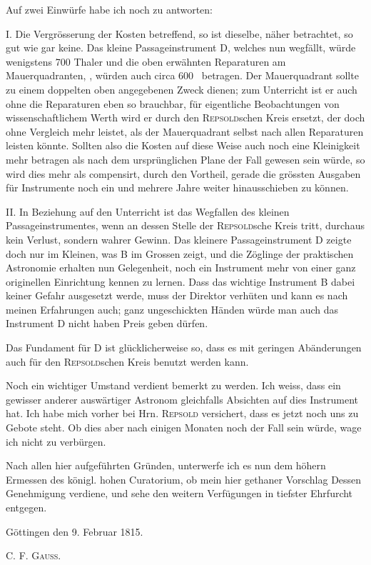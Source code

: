 Auf zwei Einwürfe habe ich noch zu antworten:\par
\noindent\hspace*{\parindent}I. Die Vergrösserung der Kosten betreffend, so ist dieselbe, näher betrachtet, so gut wie gar keine. Das kleine Passageinstrument D, welches nun wegfällt, würde wenigstens 700 Thaler und die oben erwähnten Reparaturen am Mauerquadranten, , würden auch circa 600 \InstrumentMoneyMark\ betragen. Der Mauerquadrant sollte zu einem doppelten oben angegebenen Zweck dienen; zum Unterricht ist er auch ohne die Reparaturen eben so brauchbar, für eigentliche Beobachtungen von wissenschaftlichem Werth wird er durch den \textsc{Repsold}schen Kreis ersetzt, der doch ohne Vergleich mehr leistet, als der Mauerquadrant selbst nach allen Reparaturen leisten könnte. Sollten also die Kosten auf diese Weise auch noch eine Kleinigkeit mehr betragen als nach dem ursprünglichen Plane der Fall gewesen sein würde, so wird dies mehr als compensirt, durch den Vortheil, gerade die grössten Ausgaben für Instrumente noch ein und mehrere Jahre weiter hinausschieben zu können.\par
\noindent\hspace*{\parindent}II. In Beziehung auf den Unterricht ist das Wegfallen des kleinen Passageinstrumentes, wenn an dessen Stelle der \textsc{Repsold}sche Kreis tritt,
\clearpage{}
\noindent durchaus kein Verlust, sondern wahrer Gewinn. Das kleinere Passageinstrument D zeigte doch nur im Kleinen, was B im Grossen zeigt, und die Zöglinge der praktischen Astronomie erhalten nun Gelegenheit, noch ein Instrument mehr von einer ganz originellen Einrichtung kennen zu lernen. Dass das wichtige Instrument B dabei keiner Gefahr ausgesetzt werde, muss der Direktor verhüten und kann es nach meinen Erfahrungen auch; ganz ungeschickten Händen würde man auch das Instrument D nicht haben Preis geben dürfen.

Das Fundament für D ist glücklicherweise so, dass es mit geringen Abänderungen auch für den \textsc{Repsold}schen Kreis benutzt werden kann.

Noch ein wichtiger Umstand verdient bemerkt zu werden. Ich weiss, dass ein gewisser anderer auswärtiger Astronom gleichfalls Absichten auf dies Instrument hat. Ich habe mich vorher bei Hrn. \textsc{Repsold} versichert, dass es jetzt noch uns zu Gebote steht. Ob dies aber nach einigen Monaten noch der Fall sein würde, wage ich nicht zu verbürgen.

Nach allen hier aufgeführten Gründen, unterwerfe ich es nun dem höhern Ermessen des königl. hohen Curatorium, ob mein hier gethaner Vorschlag Dessen Genehmigung verdiene, und sehe den weitern Verfügungen in tiefster Ehrfurcht entgegen.

Göttingen den 9. Februar 1815.
\begin{flushright}C. F. \textsc{Gauss}.\end{flushright}
\clearpage\endgroup
